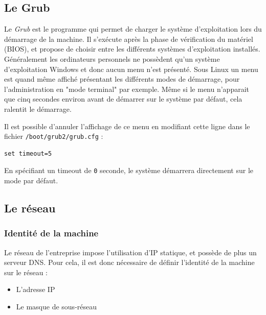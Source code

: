 \subsection{Le Grub}

Le \textit{Grub} est le programme qui permet de charger le système d'exploitation lors du démarrage de la machine.
Il s'exécute après la phase de vérification du matériel (BIOS), et propose de choisir entre les différents systèmes d'exploitation installés.
\\


Généralement les ordinateurs personnels ne possèdent qu'un système d'exploitation Windows et donc aucun menu n'est présenté.
Sous Linux un menu est quand même affiché présentant les différents modes de démarrage, pour l'administration en "mode terminal" par exemple.
Même si le menu n'apparait que cinq secondes environ avant de démarrer sur le système par défaut, cela ralentit le démarrage.

Il est possible d'annuler l'affichage de ce menu en modifiant cette ligne dans le fichier \lstinline{/boot/grub2/grub.cfg} :
\begin{lstlisting}
set timeout=5
\end{lstlisting}
En spécifiant un timeout de \lstinline{0} seconde, le système démarrera directement sur le mode par défaut.
\\





\subsection{Le réseau}


\subsubsection{Identité de la machine}

Le réseau de l'entreprise impose l'utilisation d'IP statique, et possède de plus un serveur DNS.
Pour cela, il est donc nécessaire de définir l'identité de la machine sur le réseau :
\begin{itemize}
	\item L'adresse IP
	\item Le masque de sous-réseau
\\
\end{itemize}


